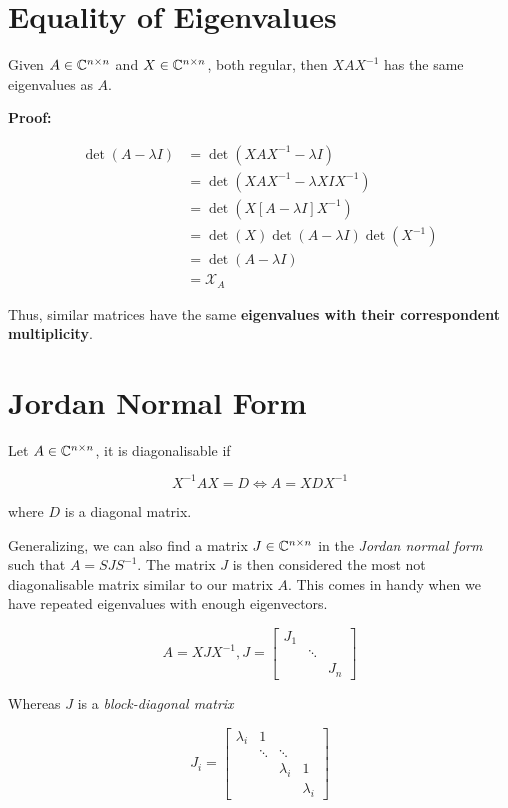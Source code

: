 \section{Equality of Eigenvalues}

Given \(A \in \mathbb{C}^{n \times n}\) and \(X \in \mathbb{C}^{n \times n}\), both regular, then \(XAX^{-1}\) has the same eigenvalues as \(A\).

\textbf{Proof:}

\begin{align*}
    \det(A - \lambda I) &= \det(XAX^{-1} - \lambda I)\\
     &= \det(XAX^{-1} - \lambda X I X^{-1})\\
     &= \det(X[A - \lambda I] X^{-1})\\
     &= \det(X)\det(A - \lambda I) \det(X^{-1})\\
     &= \det(A - \lambda I) \\ 
     &= \mathcal{X}_A
\end{align*}

Thus, similar matrices have the same \textbf{eigenvalues with their correspondent multiplicity}.

\QED

\section{Jordan Normal Form}

Let \(A \in \mathbb{C}^{n \times n}\), it is diagonalisable   if 

\[
    X^{-1}AX = D \iff A = X D X^{-1}
\]

where \(D\) is a diagonal matrix. 

Generalizing, we can also find a matrix \(J \in \mathbb{C}^{n \times n}\) in the \emph{Jordan normal form} such that \(A = S J S^{-1}\).
The matrix \(J\) is then considered the most not diagonalisable matrix similar to our matrix \(A\). This comes in handy when 
we have repeated eigenvalues with enough eigenvectors.

\[
    A = X J X^{-1}, J = 
    \begin{bmatrix}
        J_1 & & \\ 
        & \ddots & \\ 
        & & J_n
    \end{bmatrix}
\]

Whereas \(J\) is a \emph{block-diagonal matrix}


\[
    J_i = 
    \begin{bmatrix}
        \lambda_i & 1         &     \\ 
        & \ddots  & \ddots    &    \\ 
        &         & \lambda_i & 1 \\ 
        &         &           &  \lambda_i
    \end{bmatrix}
\]


